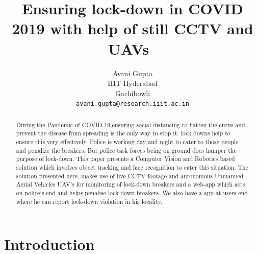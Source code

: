 \documentclass[10pt,twocolumn,letterpaper]{article}
\begin{document}
\title{\Ensuring Ensuring lock-down in COVID 2019 with help of still CCTV and UAVs\ }
\author{Avani Gupta\\
IIIT Hyderabad\\
Gachibowli\\
{\tt\small avani.gupta@research.iiit.ac.in}

\and
}
\maketitle
\begin{abstract}
    During the Pandemic of COVID 19,ensuring social distancing to flatten the curve and prevent the disease from spreading is the only way to stop it. lock-downs help to ensure this very effectively.
     Police is working day and night to cater to those people and penalize the breakers. But police task forces being on ground does hamper the purpose of lock-down. This paper presents a Computer Vision and Robotics based solution which involves object tracking and face recognition to cater this situation. The solution presented here, makes use of live CCTV footage and  autonomous Unmanned Aerial Vehicles UAV's  for monitoring of lock-down breakers and a  web-app which acts on police's end and helps penalise lock-down breakers. We also have a app at users end where he can report lock-down violation in his locality.

\end{abstract}

\section{Introduction}
\end{document}
